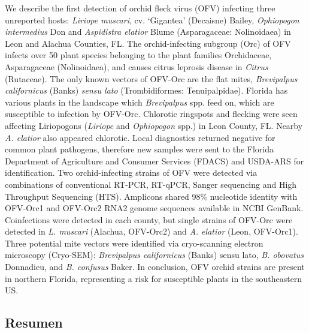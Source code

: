 \documentclass[12pt,final,CPage]{ufthesis}
\begin{document}
{  We describe the first detection of orchid fleck virus (OFV) infecting three unreported hosts: \emph{Liriope muscari}, cv. `Gigantea' (Decaisne) Bailey, \emph{Ophiopogon intermedius} Don and \emph{Aspidistra elatior} Blume (Asparagaceae: Nolinoidaea) in Leon and Alachua Counties, FL. The orchid-infecting subgroup (Orc) of OFV infects over 50 plant species belonging to the plant families Orchidaceae, Asparagaceae (Nolinoidaea), and causes citrus leprosis disease in \emph{Citrus} (Rutaceae). The only known vectors of OFV-Orc are the flat mites, \emph{Brevipalpus californicus} (Banks) \emph{sensu lato} (Trombidiformes: Tenuipalpidae). Florida has various plants in the landscape which \emph{Brevipalpus} spp. feed on, which are susceptible to infection by OFV-Orc. Chlorotic ringspots and flecking were seen affecting Liriopogons (\emph{Liriope} and \emph{Ophiopogon} spp.) in Leon County, FL. Nearby \emph{A. elatior} also appeared chlorotic. Local diagnostics returned negative for common plant pathogens, therefore new samples were sent to the Florida Department of Agriculture and Consumer Services (FDACS) and USDA-ARS for identification. Two orchid-infecting strains of OFV were detected via combinations of conventional RT-PCR, RT-qPCR, Sanger sequencing and High Throughput Sequencing (HTS). Amplicons shared 98\% nucleotide identity with OFV-Orc1 and OFV-Orc2 RNA2 genome sequences available in NCBI GenBank. Coinfections were detected in each county, but single strains of OFV-Orc were detected in \emph{L. muscari} (Alachua, OFV-Orc2) and \emph{A. elatior} (Leon, OFV-Orc1). Three potential mite vectors were identified via cryo-scanning electron microscopy (Cryo-SEM): \emph{Brevipalpus californicus} (Banks) sensu lato, \emph{B. obovatus} Donnadieu, and \emph{B. confusus} Baker. In conclusion, OFV orchid strains are present in northern Florida, representing a risk for susceptible plants in the southeastern US.

  \hypertarget{resumen}{%
  \subsection{Resumen}\label{resumen}}

}
\end{document}
